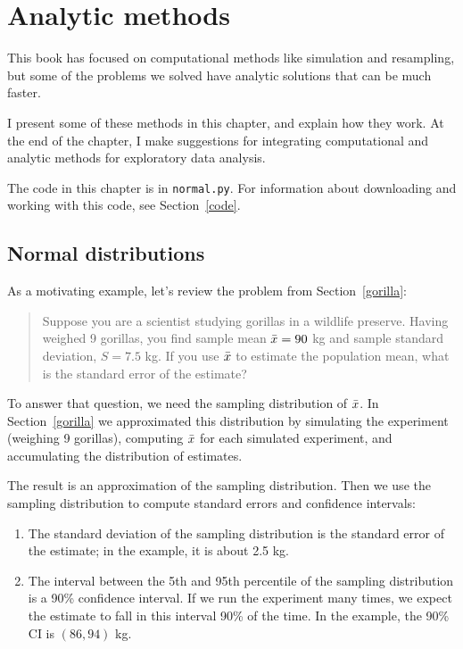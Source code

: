 \documentclass[12pt]{book}
\begin{document}
\chapter{Analytic methods}
\label{analysis}

This book has focused on computational methods like simulation and
resampling, but some of the problems we solved have
analytic solutions that can be much faster.

I present some of these methods in this chapter, and explain
how they work.  At the end of the chapter, I make suggestions
for integrating computational and analytic methods for exploratory
data analysis.

The code in this chapter is in \verb"normal.py".  For information
about downloading and working with this code, see Section~\ref{code}.


\section{Normal distributions}
\label{why_normal}

As a motivating example, let's review the problem from
Section~\ref{gorilla}:

\begin{quotation}
\noindent Suppose you are a scientist studying gorillas in a wildlife
preserve.  Having weighed 9 gorillas, you find sample mean $\bar{x}=90$ kg and
sample standard deviation, $S=7.5$ kg.  If you use $\bar{x}$ to estimate
the population mean, what is the standard error of the estimate?
\end{quotation}

To answer that question, we need the sampling
distribution of $\bar{x}$.  In Section~\ref{gorilla} we approximated
this distribution by simulating the experiment (weighing
9 gorillas), computing $\bar{x}$ for each simulated experiment, and
accumulating the distribution of estimates.

The result is an approximation of the sampling distribution.  Then we
use the sampling distribution to compute standard errors and
confidence intervals:

\begin{enumerate}

\item The standard deviation of the sampling distribution is the
  standard error of the estimate; in the example, it is about
  2.5 kg.

\item The interval between the 5th and 95th percentile of the sampling
  distribution is a 90\% confidence interval.  If we run the
  experiment many times, we expect the estimate to fall in this
  interval 90\% of the time.  In the example, the 90\% CI is
  $(86, 94)$ kg.

\end{enumerate}
\end{document}
